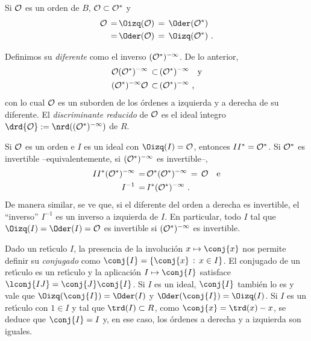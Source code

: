 Si $\cal{O}$ es un orden de $B$, $\cal{O}\subset\cal{O}^{*}$ y
\begin{align*}
	\cal{O} \,=\, & \Oizq(\cal{O}) \,=\,\Oder(\cal{O}^{*}) \\
	\,=\, & \Oder(\cal{O}) \,=\, \Oizq(\cal{O}^{*})
	\text{ .}
\end{align*}

Definimos su \emph{diferente} como el inverso $(\cal{O}^{*})^{-1}$. De lo
anterior,
\begin{align*}
	\cal{O}(\cal{O}^{*})^{-1} \,\subset\, & (\cal{O}^{*})^{-1}
	\quad\text{y} \\
	(\cal{O}^{*})^{-1}\cal{O} \,\subset\, & (\cal{O}^{*})^{-1}
	\text{ ,}
\end{align*}
%
con lo cual $\cal{O}$ es un suborden de los \'{o}rdenes a izquierda y a
derecha de su diferente. El \emph{discriminante reducido} de $\cal{O}$ es
el ideal \'{\i}ntegro $\drd{\cal{O}}:=\nrd((\cal{O}^{*})^{-1})$ de $R$.

\begin{obsDiffInvertible}
 Si $\cal{O}$ es un orden e $I$ es un ideal con $\Oizq(I)=\cal{O}$,
	entonces $II^{*}=\cal{O}^{*}$. Si $\cal{O}^{*}$ es invertible
	--equivalentemente, si $(\cal{O}^{*})^{-1}$ es invertible--,
	\begin{align*}
		II^{*}(\cal{O}^{*})^{-1} \,=\, & \cal{O}^{*}(\cal{O}^{*})^{-1}
		\,=\,\cal{O}\quad\text{e} \\
		I^{-1} \,=\, & I^{*}(\cal{O}^{*})^{-1}
		\text{ .}
	\end{align*}
	De manera similar, se ve que, si el diferente del orden a derecha
	es invertible, el ``inverso'' $I^{-1}$ es un inverso a izquierda de
	$I$. En particular, todo $I$ tal que $\Oizq(I)=\Oder(I)=\cal{O}$
	es invertible si $(\cal{O}^{*})^{-1}$ es invertible.
\end{obsDiffInvertible}


Dado un ret\'{\i}culo $I$, la presencia de la involuci\'{o}n
$x\mapsto\conj{x}$ nos permite definir su \emph{conjugado} como
$\conj{I}=\{\conj{x}\,:\,x\in I\}$. El conjugado de un ret\'{\i}culo es
un ret\'{\i}culo y la aplicaci\'{o}n $I\mapsto\conj{I}$ satisface
$\lconj{IJ}=\conj{J}\conj{I}$. Si $I$ es un ideal, $\conj{I}$ tambi\'{e}n
lo es y vale que $\Oizq(\conj{I})=\Oder(I)$ y $\Oder(\conj{I})=\Oizq(I)$.
Si $I$ es un ret\'{\i}culo con $1\in I$ y tal que $\trd(I)\subset R$, como
$\conj{x}=\trd(x)-x$, se deduce que $\conj{I}=I$ y, en ese caso, los
\'{o}rdenes a derecha y a izquierda son iguales.

